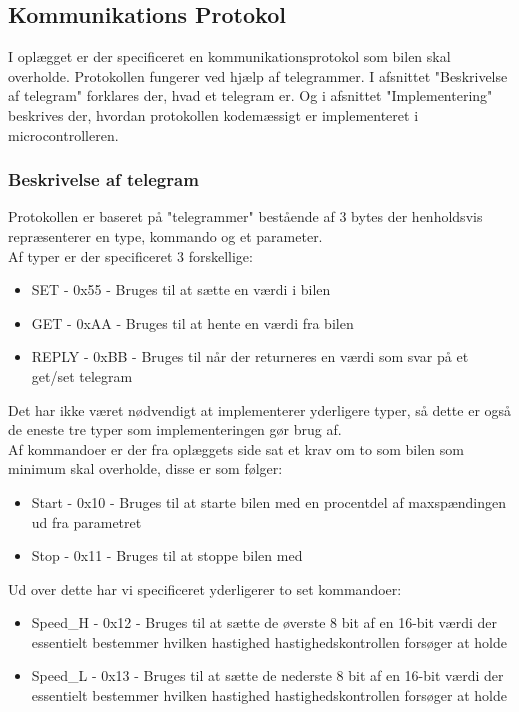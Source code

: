 \subsection{Kommunikations Protokol}
I oplægget er der specificeret en kommunikationsprotokol som bilen skal overholde. Protokollen fungerer ved hjælp af telegrammer. I afsnittet "Beskrivelse af telegram" forklares der, hvad et telegram er. Og i afsnittet "Implementering" beskrives der, hvordan protokollen kodemæssigt er implementeret i microcontrolleren.

\subsubsection{Beskrivelse af telegram}
Protokollen er baseret på "telegrammer" bestående af 3 bytes der henholdsvis repræsenterer en type, kommando og et parameter.\\
Af typer er der specificeret 3 forskellige:
\begin{itemize}
	\item SET - 0x55 - Bruges til at sætte en værdi i bilen
	\item GET - 0xAA - Bruges til at hente en værdi fra bilen
	\item REPLY - 0xBB - Bruges til når der returneres en værdi som svar på et get/set telegram
\end{itemize}
Det har ikke været nødvendigt at implementerer yderligere typer, så dette er også de eneste tre typer som implementeringen gør brug af.\\
Af kommandoer er der fra oplæggets side sat et krav om to som bilen som minimum skal overholde, disse er som følger:
\begin{itemize}
	\item Start - 0x10 - Bruges til at starte bilen med en procentdel af maxspændingen ud 			fra parametret
	\item Stop - 0x11 - Bruges til at stoppe bilen med
\end{itemize}

Ud over dette har vi specificeret yderligerer to set kommandoer:
\begin{itemize}
	\item Speed\_H - 0x12 - Bruges til at sætte de øverste 8 bit af en 16-bit værdi der essentielt bestemmer hvilken hastighed hastighedskontrollen forsøger at holde
	\item Speed\_L - 0x13 - Bruges til at sætte de nederste 8 bit af en 16-bit værdi der essentielt bestemmer hvilken hastighed hastighedskontrollen forsøger at holde
\end{itemize}

